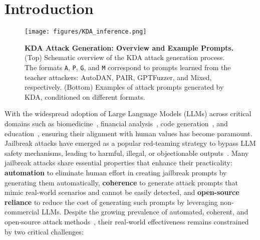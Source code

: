 


\section{Introduction}\label{sec:intro}

\begin{figure*}[h]
\centering
    \texttt{[image: figures/KDA\_inference.png]}
    \caption{\textbf{KDA Attack Generation: Overview and Example Prompts.} (Top) Schematic overview of the KDA attack generation process. The formats \texttt{A}, \texttt{P}, \texttt{G}, and \texttt{M} correspond to prompts learned from the teacher attackers: AutoDAN, PAIR, GPTFuzzer, and Mixed, respectively. (Bottom) Examples of attack prompts generated by KDA, conditioned on different formats. }\label{fig:opening}
\end{figure*}

With the widespread adoption of Large Language Models (LLMs) across critical domains such as biomedicine~\citep{tinn_fine-tuning_2023}, financial analysis~\citep{wu_bloomberggpt_2023}, code generation~\citep{roziere_code_2024}, and education~\citep{kasneci_chatgpt_2023}, ensuring their alignment with human values has become paramount. Jailbreak attacks have emerged as a popular red-teaming strategy to bypass LLM safety mechanisms, leading to harmful, illegal, or objectionable outputs~\citep{dubey_llama_2024, zou_universal_2023}. Many jailbreak attacks share essential properties that enhance their practicality: \textbf{automation} to eliminate human effort in creating jailbreak prompts by generating them automatically, \textbf{coherence} to generate attack prompts that mimic real-world scenarios and cannot be easily detected, and \textbf{open-source reliance} to reduce the cost of generating such prompts by leveraging non-commercial LLMs. Despite the growing prevalence of automated, coherent, and open-source attack methods~\citep{chao_jailbreaking_2024, liu_autodan-turbo_2024, mehrotra_tree_2024, li_deepinception_2024, yong_low-resource_2024, liu_making_2024, lv_codechameleon_2024, liu_autodan_2024, zhu_autodan_2023, wang_asetf_2024, li_semantic_2024, guo_cold-attack_2024}, their real-world effectiveness remains constrained by two critical challenges: 


